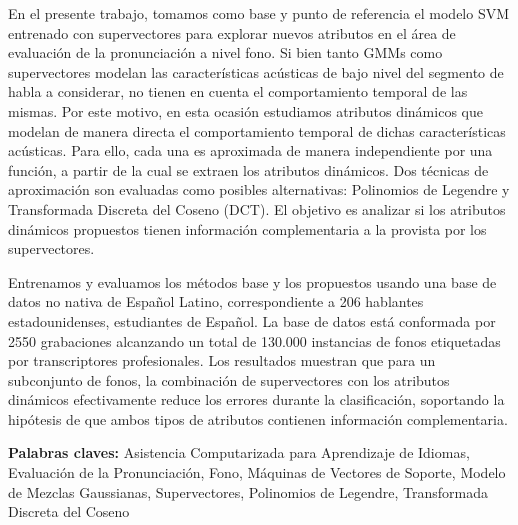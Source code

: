 En el presente trabajo, tomamos como
base y punto de referencia el modelo SVM entrenado con
supervectores para explorar nuevos atributos en el \'{a}rea de evaluaci\'{o}n de la
pronunciaci\'{o}n a nivel fono.
Si bien tanto GMMs como
supervectores modelan las caracter\'{i}sticas ac\'{u}sticas de
bajo nivel del segmento
de habla a considerar,
no tienen en cuenta el comportamiento temporal de las mismas.
Por este motivo, en esta ocasi\'{o}n
estudiamos atributos din\'{a}micos
que modelan de manera directa el comportamiento temporal de dichas
caracter\'{i}sticas ac\'{u}sticas.
Para ello, cada una es aproximada
de manera independiente por una funci\'{o}n,
a partir de la cual se extraen los atributos din\'{a}micos.
Dos t\'{e}cnicas de aproximaci\'{o}n son evaluadas como posibles alternativas:
Polinomios de Legendre y Transformada Discreta del Coseno (DCT).
El objetivo
es analizar si
los atributos din\'{a}micos propuestos tienen informaci\'{o}n
complementaria a la provista por los supervectores.

Entrenamos y evaluamos los m\'{e}todos base y los propuestos usando una base de datos no nativa
de Espa\~nol Latino, correspondiente a 206 hablantes estadounidenses, estudiantes de Espa\~nol.
La base de datos est\'{a} conformada por 2550 grabaciones alcanzando
un total de 130.000 instancias de fonos etiquetadas
por transcriptores profesionales.
Los resultados muestran que para un subconjunto de fonos, la combinaci\'{o}n de supervectores
con los atributos din\'{a}micos efectivamente reduce los errores durante la clasificaci\'{o}n,
soportando la
hip\'{o}tesis de que ambos tipos de atributos contienen informaci\'{o}n complementaria.

\bigskip

\noindent\textbf{Palabras claves:} Asistencia Computarizada para Aprendizaje de Idiomas, Evaluaci\'{o}n de la Pronunciaci\'{o}n, Fono, M\'{a}quinas de Vectores de Soporte, Modelo de Mezclas Gaussianas, Supervectores, Polinomios de Legendre, Transformada Discreta del Coseno

